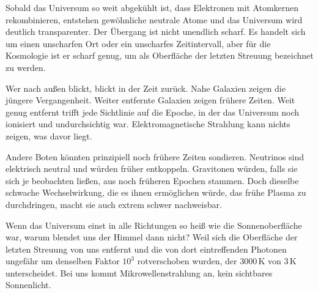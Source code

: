 Sobald das Universum so weit abgekühlt ist, dass Elektronen mit Atomkernen rekombinieren, entstehen gewöhnliche neutrale Atome und das Universum wird deutlich transparenter. Der Übergang ist nicht unendlich scharf. Es handelt sich um einen unscharfen Ort oder ein unscharfes Zeitintervall, aber für die Kosmologie ist er scharf genug, um als Oberfläche der letzten Streuung bezeichnet zu werden.

Wer nach außen blickt, blickt in der Zeit zurück. Nahe Galaxien zeigen die jüngere Vergangenheit. Weiter entfernte Galaxien zeigen frühere Zeiten. Weit genug entfernt trifft jede Sichtlinie auf die Epoche, in der das Universum noch ionisiert und undurchsichtig war. Elektromagnetische Strahlung kann nichts zeigen, was davor liegt.

Andere Boten könnten prinzipiell noch frühere Zeiten sondieren. Neutrinos sind elektrisch neutral und würden früher entkoppeln. Gravitonen würden, falls sie sich je beobachten ließen, aus noch früheren Epochen stammen. Doch dieselbe schwache Wechselwirkung, die es ihnen ermöglichen würde, das frühe Plasma zu durchdringen, macht sie auch extrem schwer nachweisbar.

Wenn das Universum einst in alle Richtungen so heiß wie die Sonnenoberfläche war, warum blendet uns der Himmel dann nicht? Weil sich die Oberfläche der letzten Streuung von uns entfernt und die von dort eintreffenden Photonen ungefähr um denselben Faktor \(10^3\) rotverschoben wurden, der \(3000\,\mathrm K\) von \(3\,\mathrm K\) unterscheidet. Bei uns kommt Mikrowellenstrahlung an, kein sichtbares Sonnenlicht.

\begin{classroomqa}\end{classroomqa}

\begin{classroomqa}\end{classroomqa}

